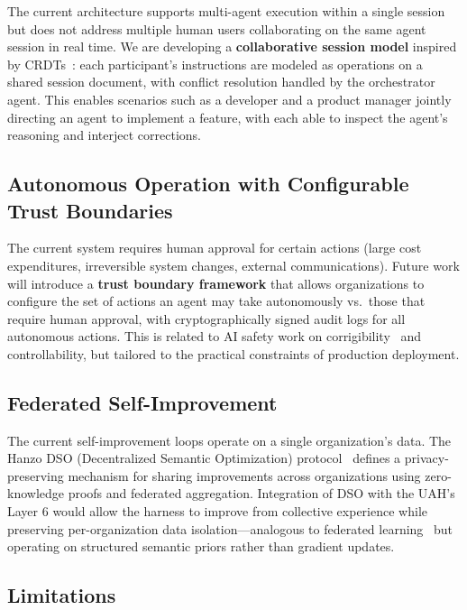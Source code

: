\documentclass[11pt]{article}
\begin{document}
The current architecture supports multi-agent execution within a single
session but does not address multiple human users collaborating on the same
agent session in real time. We are developing a \textbf{collaborative session
model} inspired by CRDTs~\cite{shapiro2011conflict}: each participant's
instructions are modeled as operations on a shared session document, with
conflict resolution handled by the orchestrator agent. This enables scenarios
such as a developer and a product manager jointly directing an agent to
implement a feature, with each able to inspect the agent's reasoning and
interject corrections.

\subsection{Autonomous Operation with Configurable Trust Boundaries}

The current system requires human approval for certain actions (large cost
expenditures, irreversible system changes, external communications). Future
work will introduce a \textbf{trust boundary framework} that allows
organizations to configure the set of actions an agent may take autonomously
vs.\ those that require human approval, with cryptographically signed audit
logs for all autonomous actions. This is related to AI safety work on
corrigibility~\cite{soares2015corrigibility} and controllability, but
tailored to the practical constraints of production deployment.

\subsection{Federated Self-Improvement}

The current self-improvement loops operate on a single organization's data.
The Hanzo DSO (Decentralized Semantic Optimization) protocol~\cite{hanzo2024dso}
defines a privacy-preserving mechanism for sharing improvements across
organizations using zero-knowledge proofs and federated aggregation.
Integration of DSO with the UAH's Layer 6 would allow the harness to
improve from collective experience while preserving per-organization data
isolation---analogous to federated learning~\cite{mcmahan2017communication}
but operating on structured semantic priors rather than gradient updates.

\subsection{Limitations}
\end{document}
